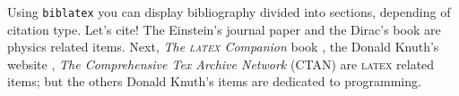 \kant[1] 

Using \texttt{biblatex} you can display bibliography divided into sections,  depending of citation type. Let's cite! The Einstein's journal paper \cite{einstein} and the Dirac's book \cite{dirac} are physics related items. Next, \textit{The \textsc{latex} Companion} book \cite{latexcompanion}, the Donald Knuth's website \cite{knuthwebsite}, \textit{The Comprehensive Tex Archive Network} (CTAN) \cite{ctan} are \textsc{latex} related items; but the others Donald Knuth's items \cite{knuth-fa,knuth-acp} are dedicated to programming. 


